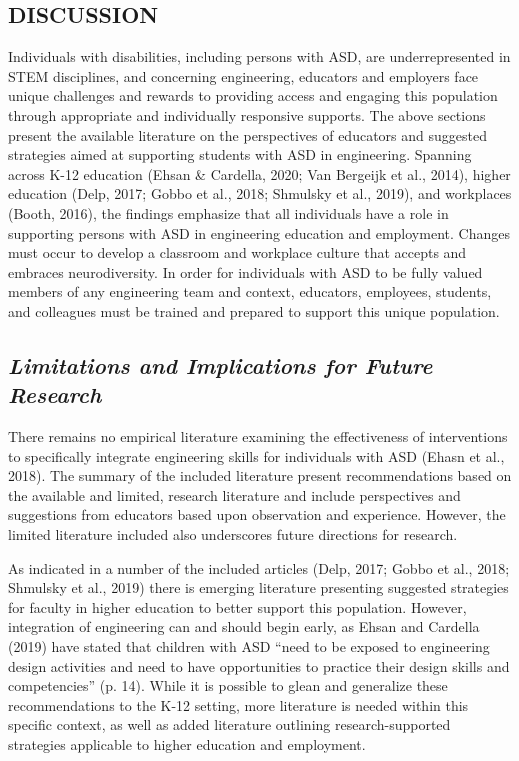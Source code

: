 \documentclass[11.5pt]{sig-alternate}
\begin{document}
\begin{large}
\section*{DISCUSSION}

Individuals with disabilities, including persons with ASD, are underrepresented in STEM disciplines, and concerning engineering, educators and employers face unique challenges and rewards to providing access and engaging this population through appropriate and individually responsive supports. The above sections present the available literature on the perspectives of educators and suggested strategies aimed at supporting students with ASD in engineering. Spanning across K-12 education (Ehsan \& Cardella, 2020; Van Bergeijk et al., 2014), higher education (Delp, 2017; Gobbo et al., 2018; Shmulsky et al., 2019), and workplaces (Booth, 2016), the findings emphasize that all individuals have a role in supporting persons with ASD in engineering education and employment. Changes must occur to develop a classroom and workplace culture that accepts and embraces neurodiversity. In order for individuals with ASD to be fully valued members of any engineering team and context, educators, employees, students, and colleagues must be trained and prepared to support this unique population. 

\subsection*{\textbf{\textit{Limitations and Implications for Future Research}}}

There remains no empirical literature examining the effectiveness of interventions to specifically integrate engineering skills for individuals with ASD (Ehasn et al., 2018). The summary of the included literature present recommendations based on the available and limited, research literature and include perspectives and suggestions from educators based upon observation and experience. However, the limited literature included also underscores future directions for research. 

As indicated in a number of the included articles (Delp, 2017; Gobbo et al., 2018; Shmulsky et al., 2019) there is emerging literature presenting suggested strategies for faculty in higher education to better support this population. However, integration of engineering can and should begin early, as Ehsan and Cardella (2019) have stated that children with ASD “need to be exposed to engineering design activities and need to have opportunities to practice their design skills and competencies” (p. 14). While it is possible to glean and generalize these recommendations to the K-12 setting, more literature is needed within this specific context, as well as added literature outlining research-supported strategies applicable to higher education and employment. 


\end{large}
\end{document}
